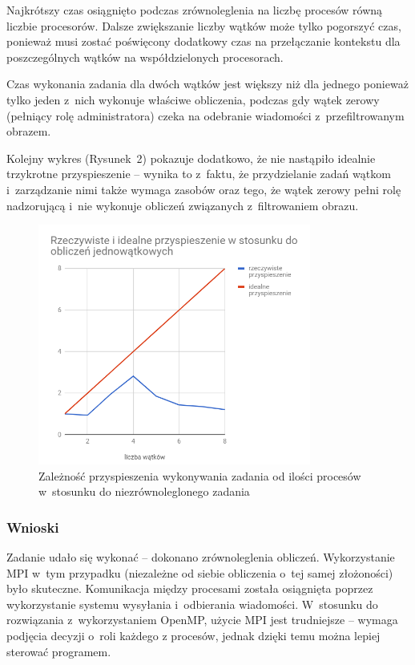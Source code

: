 \documentclass[a4paper,12pt]{article}
\begin{document}
Najkrótszy czas osiągnięto podczas zrównoleglenia na liczbę procesów równą liczbie procesorów. Dalsze zwiększanie liczby wątków może tylko pogorszyć czas, ponieważ musi zostać poświęcony dodatkowy czas na przełączanie kontekstu dla poszczególnych wątków na współdzielonych procesorach.

Czas wykonania zadania dla dwóch wątków jest większy niż dla jednego ponieważ tylko jeden z~nich wykonuje właściwe obliczenia, podczas gdy wątek zerowy (pełniący rolę administratora) czeka na odebranie wiadomości z~przefiltrowanym obrazem.

Kolejny wykres (Rysunek~2) pokazuje dodatkowo, że nie nastąpiło idealnie trzykrotne przyspieszenie -- wynika to z~faktu, że przydzielanie zadań wątkom i~zarządzanie nimi także wymaga zasobów oraz tego, że wątek zerowy pełni rolę nadzorującą i~nie wykonuje obliczeń związanych z~filtrowaniem obrazu.

\begin{figure}[!hbtp]
  \centering
  \includegraphics[width=0.8\textwidth]{wykres2.png}
  \caption{Zależność przyspieszenia wykonywania zadania od ilości procesów w~stosunku do niezrównoleglonego zadania}
\end{figure}

\subsubsection*{Wnioski }
Zadanie udało się wykonać -- dokonano zrównoleglenia obliczeń. Wykorzystanie MPI w~tym przypadku (niezależne od siebie obliczenia o~tej samej złożoności) było skuteczne. Komunikacja między procesami została osiągnięta poprzez wykorzystanie systemu wysyłania i~odbierania wiadomości. W~stosunku do rozwiązania z~wykorzystaniem OpenMP, użycie MPI jest trudniejsze -- wymaga podjęcia decyzji o~roli każdego z procesów, jednak dzięki temu można lepiej sterować programem.
\end{document}
